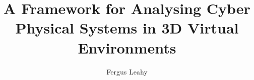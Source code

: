 \documentclass[a4paper,12pt,twoside]{report}
\begin{document}
\title{\LARGE {\bf A Framework for Analysing Cyber Physical Systems in 3D Virtual Environments}\\
 \vspace*{6mm}
}

\author{Fergus Leahy}

\normallinespacing
\maketitle

\preface





\body











\appendix




\end{document}
